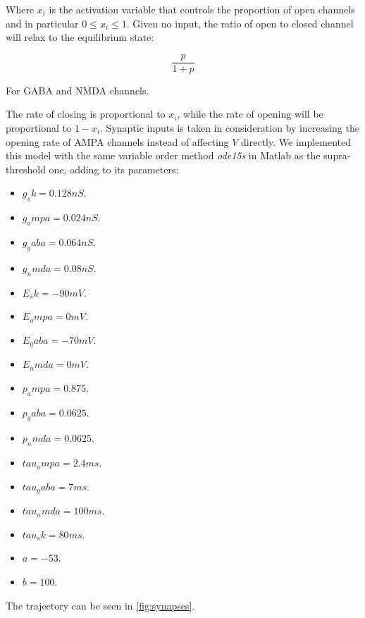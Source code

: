 		Where $x_i$ is the activation variable that controls the proportion of open channels and in particular $0\le x_i\le 1$.
		Given no input, the ratio of open to closed channel will relax to the equilibrium state:

		$$\frac{p}{1+p}$$

		For GABA and NMDA channels.

		The rate of closing is proportional to $x_i$, while the rate of opening will be proportional to $1-x_i$.
		Synaptic inputs is taken in consideration by increasing the opening rate of AMPA channels instead of affecting $V$ directly.
		We implemented this model with the same variable order method \emph{ode15s} in Matlab as the supra-threshold one, adding to its parameters:

		\begin{multicols}{2}
			\begin{itemize}
				\item $g_sk = 0.128 nS$.
				\item $g_ampa = 0.024 nS$.
				\item $g_gaba = 0.064 nS$.
				\item $g_nmda = 0.08 nS$.
				\item $E_sk = -90 mV$.
				\item $E_ampa = 0 mV$.
				\item $E_gaba = -70 mV$.
				\item $E_nmda = 0 mV$.
				\item $p_ampa = 0.875$.
				\item $p_gaba = 0.0625$.
				\item $p_nmda = 0.0625$.
				\item $tau_ampa = 2.4 ms$.
				\item $tau_gaba = 7 ms$.
				\item $tau_nmda = 100 ms$.
				\item $tau_sk = 80 ms$.
				\item $a = -53$.
				\item $b = 100$.
			\end{itemize}
		\end{multicols}

		The trajectory can be seen in \ref{fig:synapses}.

